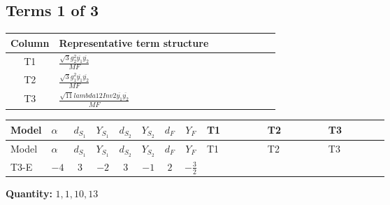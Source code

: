 \documentclass[8pt]{article}
\begin{document}
\begin{landscape}
\subsection*{Terms 1 of 3}
\begin{center}
\begin{tabular}{@{}c >{\raggedright\arraybackslash}p{0.82\linewidth}@{}}
\toprule
Column & Representative term structure \\
\midrule
T1 & \(\displaystyle \frac{\sqrt{3} g_{2}^{2} \overline{y_{1}} \overline{y_{2}}}{MF}\) \\
\midrule
T2 & \(\displaystyle \frac{\sqrt{3} g_{1}^{2} \overline{y_{1}} \overline{y_{2}}}{MF}\) \\
\midrule
T3 & \(\displaystyle \frac{\sqrt{11} lambda12Inv2 \overline{y_{1}} \overline{y_{2}}}{MF}\) \\
\midrule
\bottomrule
\end{tabular}
\end{center}
\smallskip
\tiny
\begin{longtable}{@{}llcccccc >{\raggedright\arraybackslash}p{0.21\linewidth} >{\raggedright\arraybackslash}p{0.21\linewidth} >{\raggedright\arraybackslash}p{0.21\linewidth}@{}}
\toprule
Model & $\alpha$ & $d_{S_1}$ & $Y_{S_1}$ & $d_{S_2}$ & $Y_{S_2}$ & $d_F$ & $Y_F$ & T1 & T2 & T3 \\
\midrule
\endfirsthead
\toprule
Model & $\alpha$ & $d_{S_1}$ & $Y_{S_1}$ & $d_{S_2}$ & $Y_{S_2}$ & $d_F$ & $Y_F$ & T1 & T2 & T3 \\
\midrule
\endhead
T3-E & $-4$ & $3$ & $-2$ & $3$ & $-1$ & $2$ & $-\frac{3}{2}$ & \scriptsize\adjustbox{max width=\linewidth}{$\begin{gathered} - \frac{49 \sqrt{3} g_{2}^{2} \overline{y_{1}} \overline{y_{2}}}{24 MF}\end{gathered}$} & \scriptsize\adjustbox{max width=\linewidth}{$\begin{gathered} - \frac{9 \sqrt{3} g_{1}^{2} \overline{y_{1}} \overline{y_{2}}}{8 MF}\end{gathered}$} & \scriptsize\adjustbox{max width=\linewidth}{$\begin{gathered} - \frac{3 \sqrt{11} lambda12Inv2 \overline{y_{1}} \overline{y_{2}}}{22 MF}\end{gathered}$} \\
\midrule
\bottomrule
\end{longtable}
\clearpage
\noindent\textbf{Quantity: }$\mathrm{1,1,10,13}$\par\smallskip

\end{landscape}
\end{document}

